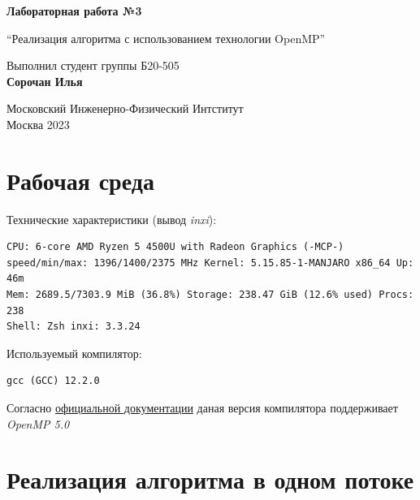 \documentclass[a4paper, 12pt]{article}
\begin{document}
\hypersetup{pageanchor=false}
\begin{titlepage}
 \begin{center}
  \vspace*{1cm}

  \Huge
  \textbf{Лабораторная работа №3}

  \vspace{0.5cm}
  \LARGE
  ``Реализация алгоритма с использованием технологии OpenMP''

  \vspace{1.5cm}
  Выполнил студент группы Б20-505\\
  \textbf{Сорочан Илья}

  \vfill

  \Large
  Московский Инженерно-Физический Интститут\\
  Москва 2023

 \end{center}
\end{titlepage}



\section{Рабочая среда}

Технические характеристики (вывод \textit{inxi}):
\begin{verbatim}
CPU: 6-core AMD Ryzen 5 4500U with Radeon Graphics (-MCP-)
speed/min/max: 1396/1400/2375 MHz Kernel: 5.15.85-1-MANJARO x86_64 Up: 46m
Mem: 2689.5/7303.9 MiB (36.8%) Storage: 238.47 GiB (12.6% used) Procs: 238
Shell: Zsh inxi: 3.3.24
\end{verbatim}

Используемый компилятор:
\begin{verbatim}
gcc (GCC) 12.2.0
\end{verbatim}

Согласно \href{https://www.openmp.org/resources/openmp-compilers-tools/}{официальной документации} даная версия компилятора поддерживает \textit{OpenMP 5.0}



\section{Реализация алгоритма в одном потоке}
\end{document}
